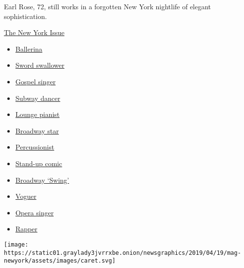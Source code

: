 Earl Rose, 72, still works in a forgotten New York nightlife of elegant
sophistication.

\href{https://www.nytimes3xbfgragh.onion/interactive/2019/05/30/magazine/performers-new-york.html}{The
New York Issue}

\begin{itemize}
\tightlist
\item
  \href{https://www.nytimes3xbfgragh.onion/interactive/2019/05/30/magazine/dance-ballet-new-york.html}{Ballerina}
\item
  \href{https://www.nytimes3xbfgragh.onion/interactive/2019/05/30/magazine/sword-swallowing-new-york.html}{Sword
  swallower}
\item
  \href{https://www.nytimes3xbfgragh.onion/interactive/2019/05/30/magazine/gospel-singer-new-york.html}{Gospel
  singer}
\item
  \href{https://www.nytimes3xbfgragh.onion/interactive/2019/05/30/magazine/subway-dance-new-york.html}{Subway
  dancer}
\item
  \href{https://www.nytimes3xbfgragh.onion/interactive/2019/05/30/magazine/earl-rose-piano-carlyle-new-york.html}{Lounge
  pianist}
\item
  \href{https://www.nytimes3xbfgragh.onion/interactive/2019/05/30/magazine/broadway-kiss-me-kate.html}{Broadway
  star}
\item
  \href{https://www.nytimes3xbfgragh.onion/interactive/2019/05/30/magazine/latin-beat-new-york.html}{Percussionist}
\item
  \href{https://www.nytimes3xbfgragh.onion/interactive/2019/05/30/magazine/female-comedy-new-york.html}{Stand-up
  comic}
\item
  \href{https://www.nytimes3xbfgragh.onion/interactive/2019/05/30/magazine/aladdin-musical-new-york.html}{Broadway
  `Swing'}
\item
  \href{https://www.nytimes3xbfgragh.onion/interactive/2019/05/30/magazine/vogue-kiki-new-york.html}{Voguer}
\item
  \href{https://www.nytimes3xbfgragh.onion/interactive/2019/05/30/magazine/metropolitan-opera-singer-new-york.html}{Opera
  singer}
\item
  \href{https://www.nytimes3xbfgragh.onion/interactive/2019/05/30/magazine/princess-nokia-new-york.html}{Rapper}
\end{itemize}

\texttt{[image: https://static01.graylady3jvrrxbe.onion/newsgraphics/2019/04/19/mag-newyork/assets/images/caret.svg]}

